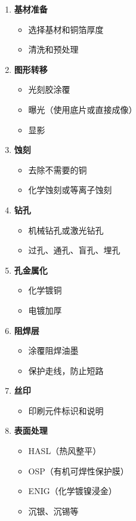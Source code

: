 \begin{enumerate}
  \item \textbf{基材准备}
    \begin{itemize}
      \item 选择基材和铜箔厚度
      \item 清洗和预处理
    \end{itemize}

  \item \textbf{图形转移}
    \begin{itemize}
      \item 光刻胶涂覆
      \item 曝光（使用底片或直接成像）
      \item 显影
    \end{itemize}

  \item \textbf{蚀刻}
    \begin{itemize}
      \item 去除不需要的铜
      \item 化学蚀刻或等离子蚀刻
    \end{itemize}

  \item \textbf{钻孔}
    \begin{itemize}
      \item 机械钻孔或激光钻孔
      \item 过孔、通孔、盲孔、埋孔
    \end{itemize}

  \item \textbf{孔金属化}
    \begin{itemize}
      \item 化学镀铜
      \item 电镀加厚
    \end{itemize}

  \item \textbf{阻焊层}
    \begin{itemize}
      \item 涂覆阻焊油墨
      \item 保护走线，防止短路
    \end{itemize}

  \item \textbf{丝印}
    \begin{itemize}
      \item 印刷元件标识和说明
    \end{itemize}

  \item \textbf{表面处理}
    \begin{itemize}
      \item HASL（热风整平）
      \item OSP（有机可焊性保护膜）
      \item ENIG（化学镀镍浸金）
      \item 沉银、沉锡等
    \end{itemize}


\end{enumerate}
